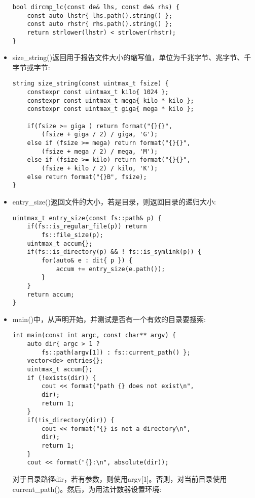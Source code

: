 \begin{itemize}
\begin{lstlisting}[style=styleCXX]
bool dircmp_lc(const de& lhs, const de& rhs) {
	const auto lhstr{ lhs.path().string() };
	const auto rhstr{ rhs.path().string() };
	return strlower(lhstr) < strlower(rhstr);
}
\end{lstlisting}

\item 
size\_string()返回用于报告文件大小的缩写值，单位为千兆字节、兆字节、千字节或字节:

\begin{lstlisting}[style=styleCXX]
string size_string(const uintmax_t fsize) {
	constexpr const uintmax_t kilo{ 1024 };
	constexpr const uintmax_t mega{ kilo * kilo };
	constexpr const uintmax_t giga{ mega * kilo };
	
	if(fsize >= giga ) return format("{}{}",
		(fsize + giga / 2) / giga, 'G');
	else if (fsize >= mega) return format("{}{}",
		(fsize + mega / 2) / mega, 'M');
	else if (fsize >= kilo) return format("{}{}",
		(fsize + kilo / 2) / kilo, 'K');
	else return format("{}B", fsize);
}
\end{lstlisting}

\item 
entry\_size()返回文件的大小，若是目录，则返回目录的递归大小:

\begin{lstlisting}[style=styleCXX]
uintmax_t entry_size(const fs::path& p) {
	if(fs::is_regular_file(p)) return
		fs::file_size(p);
	uintmax_t accum{};
	if(fs::is_directory(p) && ! fs::is_symlink(p)) {
		for(auto& e : dit{ p }) {
			accum += entry_size(e.path());
		}
	}
	return accum;
}
\end{lstlisting}

\item 
main()中，从声明开始，并测试是否有一个有效的目录要搜索:

\begin{lstlisting}[style=styleCXX]
int main(const int argc, const char** argv) {
	auto dir{ argc > 1 ?
		fs::path(argv[1]) : fs::current_path() };
	vector<de> entries{};
	uintmax_t accum{};
	if (!exists(dir)) {
		cout << format("path {} does not exist\n",
		dir);
		return 1;
	}
	if(!is_directory(dir)) {
		cout << format("{} is not a directory\n",
		dir);
		return 1;
	}
	cout << format("{}:\n", absolute(dir));
\end{lstlisting}

对于目录路径dir，若有参数，则使用argv[1]。否则，对当前目录使用current\_path()。然后，为用法计数器设置环境:


\end{itemize}
